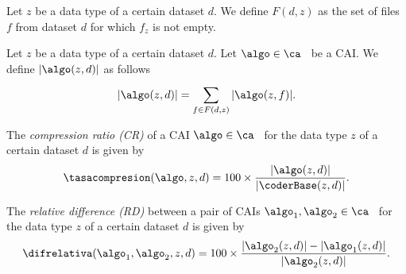 \vspace{+5pt}
\begin{defcion}
\label{eq:coding-size-dataset}
Let $z$ be a data type of a certain dataset $d$. We define $F(d, z)$ as the set of files $f$ from dataset $d$ for which $f_z$ is not empty.
\end{defcion}


\begin{defcion}
Let $z$ be a data type of a certain dataset $d$. Let $\algo \in \ca$ \ be a CAI. We define $|\algo(z, d)|$ as follows
\vspace{-5pt}
\begin{equation}
\label{eq:dataset-size}
|\algo(z, d)|  = \sum_{f \in F(d, z)}^{} |\algo(z, f)|.
\end{equation}
\end{defcion}


\vspace{+3pt}
\begin{defcion}
The \textit{compression ratio (CR)} of a CAI $\algo \in \ca$ \ for the data type $z$ of a certain dataset $d$ is given by
\vspace{-5pt}
\begin{equation}
\label{eq:compression-rate-dataset}
\tasacompresion(\algo, z, d) = 100\times\frac{|\algo(z, d)|}{|\coderBase(z, d)|}.
\end{equation}
\end{defcion}


\vspace{+3pt}
\begin{defcion}
\label{def:relative-difference-dataset}
The \textit{relative difference (RD)} between a pair of CAIs $\algo_1, \algo_2 \in {\ca}$ \ for the data type $z$ of a certain dataset $d$ is given by
\vspace{-5pt}
\begin{equation}
\label{eq:relative-difference-dataset}
\difrelativa(\algo_1, \algo_2, z, d)  =
100\times\frac{|\algo_2 (z, d)| - |\algo_1 (z, d)|}{ |\algo_2 (z, d)| }.
\end{equation}
\end{defcion}


\clearpage